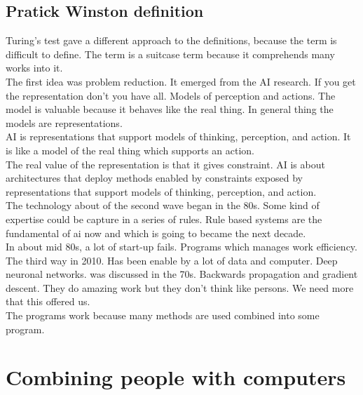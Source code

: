 \documentclass{article}
\begin{document}
	\subsection{Pratick Winston definition}
	Turing's test gave a different approach to the definitions, because the term is difficult to define.
	The term is a suitcase term because it comprehends many works into it.\\
	The first idea was problem reduction. It emerged from the AI research. If you get the representation don't you have all. Models of perception and actions. The model is valuable because it behaves like the real thing. In general thing the models are representations.\\ 
	AI is representations that support models of thinking, perception, and action. It is like a model of the real thing which supports an action.\\
	The real value of the representation is that it gives constraint. AI is about architectures that deploy methods enabled by constraints exposed by representations that support models of thinking, perception, and action.\\
	The technology about of the second wave began in the 80s. Some kind of expertise could be capture in a series of rules. Rule based systems are the fundamental of ai now and which is going to became the next decade.\\
	In about mid 80s, a lot of start-up fails. Programs which manages work efficiency. 
	The third way in 2010. Has been enable by a lot of data and computer. Deep neuronal networks. was discussed in the 70s. Backwards propagation and gradient descent. They do amazing work but they don't think like persons. We need more that this offered us.\\
	The programs work because many methods are used combined into some program.

\section{Combining people with computers}
	\
\end{document}
